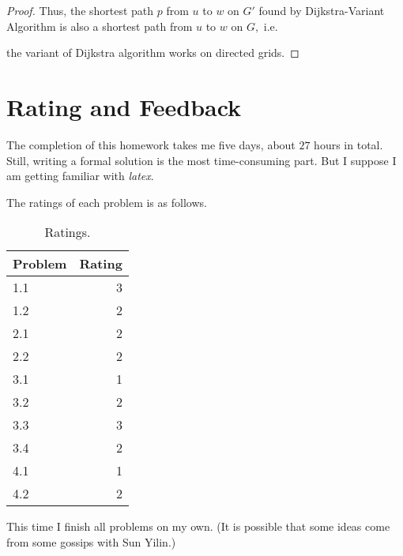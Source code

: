 \documentclass{article}
\begin{document}
\begin{proof}
    \vspace{0.5em} \hspace{1.3em}
    Thus, the shortest path $p$ from $u$ to $w$ on $G'$ found by Dijkstra-Variant Algorithm is also a shortest path from $u$ to $w$ on $G,$ i.e.
    
    \hspace{7.3em}
    the variant of Dijkstra algorithm works on directed grids.
\end{proof}


\vspace{3em}
\section{Rating and Feedback}
\vspace{1em} \hspace{1.2em}
The completion of this homework takes me five days, about $27$ hours in total. Still, writing a formal solution is the most time-consuming part. But I suppose I am getting familiar with \textit{latex}.

The ratings of each problem is as follows.

\begin{table}[htbp]
    \centering
    \begin{tabular}{lr}
        \hline
        Problem & Rating \\
        \hline 
        1.1 & 3 \\
        1.2 & 2 \\
        \hline
        2.1 & 2 \\
        2.2 & 2 \\
        \hline
        3.1 & 1 \\
        3.2 & 2 \\
        3.3 & 3 \\
        3.4 & 2 \\
        \hline
        4.1 & 1 \\
        4.2 & 2 \\
        \hline
\end{tabular}
\caption{Ratings.}
\end{table}

This time I finish all problems on my own. (It is possible that some ideas come from some gossips with Sun Yilin.)
\end{document}
